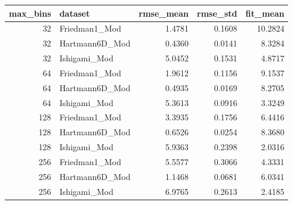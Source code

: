 \begin{tabular}{rlrrr}
\toprule
max_bins & dataset & rmse_mean & rmse_std & fit_mean \\
\midrule
32 & Friedman1_Mod & 1.4781 & 0.1608 & 10.2824 \\
32 & Hartmann6D_Mod & 0.4360 & 0.0141 & 8.3284 \\
32 & Ishigami_Mod & 5.0452 & 0.1531 & 4.8717 \\
64 & Friedman1_Mod & 1.9612 & 0.1156 & 9.1537 \\
64 & Hartmann6D_Mod & 0.4935 & 0.0169 & 8.2705 \\
64 & Ishigami_Mod & 5.3613 & 0.0916 & 3.3249 \\
128 & Friedman1_Mod & 3.3935 & 0.1756 & 6.4416 \\
128 & Hartmann6D_Mod & 0.6526 & 0.0254 & 8.3680 \\
128 & Ishigami_Mod & 5.9363 & 0.2398 & 2.0316 \\
256 & Friedman1_Mod & 5.5577 & 0.3066 & 4.3331 \\
256 & Hartmann6D_Mod & 1.1468 & 0.0681 & 6.0341 \\
256 & Ishigami_Mod & 6.9765 & 0.2613 & 2.4185 \\
\bottomrule
\end{tabular}

